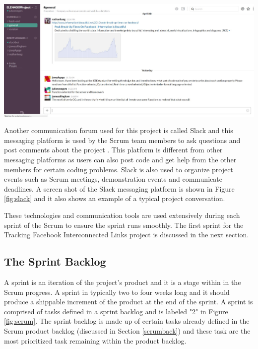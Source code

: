 \documentclass[12pt,onecolumn]{article}
\begin{document}
	\begin{center}
		\includegraphics[width=\textwidth]{slick}
		 \label{fig:slack}
	\end{center}
	
	Another communication forum used for this project is called Slack and this messaging platform is used by the Scrum team members to ask questions and post comments about the project \cite{slack}. This platform is different from other messaging platforms as users can also post code and get help from the other members for certain coding problems. Slack is also used to organize project events such as Scrum meetings, demonstration events and communicate deadlines. A screen shot of the Slack messaging platform is shown in Figure \ref{fig:slack} and it also shows an example of a typical project conversation.
	
	
	
	These technologies and communication tools are used extensively during each sprint of the Scrum to ensure the sprint runs smoothly. The first sprint for the Tracking Facebook Interconnected Links project is discussed in the next section. 
	
	
	\subsection{The Sprint Backlog } \label{sprintback}
	A sprint is an iteration of the project's product and it is a stage within in the Scrum progress. A sprint in typically two to four weeks long and it should produce a shippable increment of the product at the end of the sprint. A sprint is comprised of tasks defined in a sprint backlog and is labeled "2" in Figure \ref{fig:scrum}. The sprint backlog is made up of certain tasks already defined in the Scrum product backlog (discussed in Section \ref{scrumback}) and these task are the most prioritized task remaining within the product backlog. 
	
\end{document}
